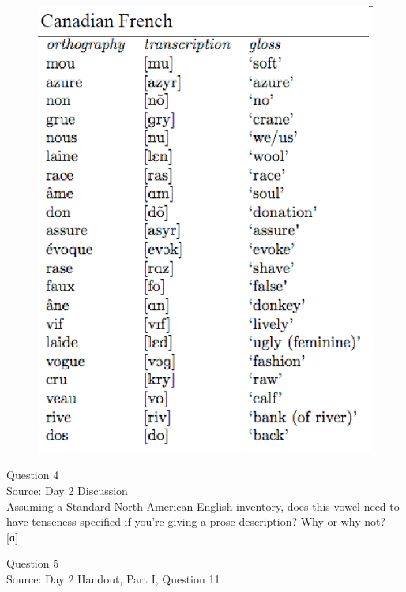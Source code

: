 \documentclass[12pt]{article}
\begin{document}
\begin{figure}[H]
\includegraphics{../images/canadianfrench.png}
\end{figure}

\newpage

{\large Question 4}\\

Source: Day 2 Discussion\\

Assuming a Standard North American English inventory, does this vowel need to have tenseness specified if you're giving a prose description? Why or why not?\\

{[ɑ]}


\newpage

{\large Question 5}\\

Source: Day 2 Handout, Part I, Question 11\\
\end{document}
